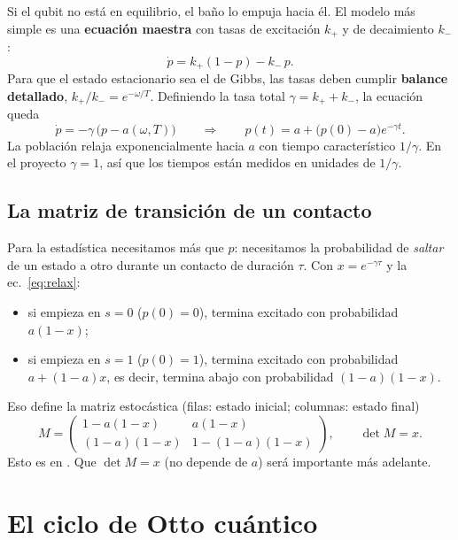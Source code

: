 Si el qubit no está en equilibrio, el baño lo empuja hacia él. El modelo más simple es una
\textbf{ecuación maestra} con tasas de excitación $k_+$ y de decaimiento $k_-$:
\begin{equation}
\dot p = k_+(1-p) - k_-\,p .
\end{equation}
Para que el estado estacionario sea el de Gibbs, las tasas deben cumplir \textbf{balance detallado},
$k_+/k_- = e^{-\omega/T}$. Definiendo la tasa total $\gamma = k_+ + k_-$, la ecuación queda
\begin{equation}
\dot p = -\gamma\,\bigl(p - a(\omega,T)\bigr)
\qquad\Longrightarrow\qquad
p(t) = a + \bigl(p(0) - a\bigr)e^{-\gamma t}.
\label{eq:relax}
\end{equation}
La población relaja exponencialmente hacia $a$ con tiempo característico $1/\gamma$. En el proyecto
$\gamma = 1$, así que los tiempos están medidos en unidades de $1/\gamma$.

\subsection{La matriz de transición de un contacto}

Para la estadística necesitamos más que $p$: necesitamos la probabilidad de \emph{saltar} de un
estado a otro durante un contacto de duración $\tau$. Con $x = e^{-\gamma\tau}$ y la
ec.~\eqref{eq:relax}:
\begin{itemize}
\item si empieza en $s=0$ ($p(0)=0$), termina excitado con probabilidad $a(1-x)$;
\item si empieza en $s=1$ ($p(0)=1$), termina excitado con probabilidad $a + (1-a)x$, es decir,
  termina abajo con probabilidad $(1-a)(1-x)$.
\end{itemize}
Eso define la matriz estocástica (filas: estado inicial; columnas: estado final)
\begin{equation}
M = \begin{pmatrix} 1 - a(1-x) & a(1-x) \\ (1-a)(1-x) & 1 - (1-a)(1-x)\end{pmatrix},
\qquad \det M = x .
\label{eq:M}
\end{equation}
Esto es  en . Que $\det M = x$ (no depende de $a$)
será importante más adelante.

\section{El ciclo de Otto cuántico}

